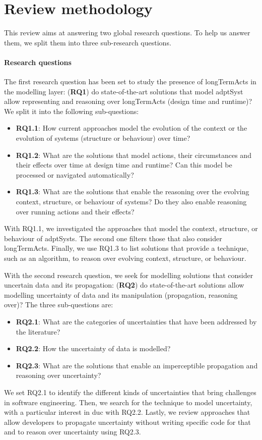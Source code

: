 \section{Review methodology}

This review aims at answering two global research questions.
To help us answer them, we split them into three sub-research questions.

\paragraph{Research questions}
The first research question has been set to study the presence of \glspl{longTermAct} in the modelling layer: (\textbf{RQ1}) do state-of-the-art solutions that model \gls{adptSyst} allow representing and reasoning over \glspl{longTermAct} (design time and runtime)? 
We split it into the following sub-questions:
\begin{itemize}
	\item \textbf{RQ1.1}: How current approaches model the evolution of the \gls{context} or the evolution of systems (\gls{structure} or \gls{behaviour}) over time?
	\item \textbf{RQ1.2}: What are the solutions that model \glspl{action}, their \glspl{circumstance} and their effects over time at design time and runtime? Can this model be processed or navigated automatically?
	\item \textbf{RQ1.3}: What are the solutions that enable the reasoning over the evolving \gls{context}, \gls{structure}, or \gls{behaviour} of systems? Do they also enable reasoning over running \glspl{action} and their effects?
\end{itemize}
With RQ1.1, we investigated the approaches that model the \gls{context}, \gls{structure}, or \gls{behaviour} of \glspl{adptSyst}.
The second one filters those that also consider \glspl{longTermAct}.
Finally, we use RQ1.3 to list solutions that provide a technique, such as an algorithm, to reason over evolving \gls{context}, \gls{structure}, or \gls{behaviour}.

With the second research question, we seek for modelling solutions that consider uncertain data and its propagation: (\textbf{RQ2}) do state-of-the-art solutions allow modelling uncertainty of data and its manipulation (propagation, reasoning over)?
The three sub-questions are:
\begin{itemize}
	\item \textbf{RQ2.1}: What are the categories of uncertainties that have been addressed by the literature?
	\item \textbf{RQ2.2}: How the uncertainty of data is modelled?
	\item \textbf{RQ2.3}: What are the solutions that enable an imperceptible propagation and reasoning over uncertainty?
\end{itemize}
We set RQ2.1 to identify the different kinds of uncertainties that bring challenges in software engineering.
Then, we search for the technique to model uncertainty, with a particular interest in \gls{duc} with RQ2.2.
Lastly, we review approaches that allow developers to propagate uncertainty without writing specific code for that and to reason over uncertainty using RQ2.3.

